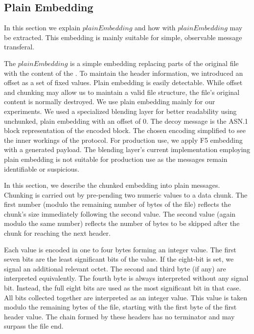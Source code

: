 \subsection{Plain Embedding}
In this section we explain $plainEmbedding$ and how \VortexMessages{} with $plainEmbedding$ may be extracted. This embedding is mainly suitable for simple, observable message transferal.

The $plainEmbedding$ is a simple embedding replacing parts of the original file with the content of the \VortexMessage. To maintain the header information, we introduced an offset as a set of fixed values. Plain embedding is easily detectable. While offset and chunking may allow us to maintain a valid file structure, the file's original content is normally destroyed. We use plain embedding mainly for our experiments. We used a specialized blending layer for better readability using unchunked, plain embedding with an offset of $0$. The decoy message is the ASN.1 block representation of the encoded block. The chosen encoding simplified to see the inner workings of the protocol. For production use, we apply F5 embedding with a generated payload. The blending layer's current implementation employing plain embedding is not suitable for production use as the messages remain identifiable or suspicious.


\label{sec:chunkingPlain}
In this section, we describe the chunked embedding into plain messages. Chunking is carried out by pre-pending two numeric values to a data chunk. The first number (modulo the remaining number of bytes of the file) reflects the chunk's size immediately following the second value. The second value (again modulo the same number)  reflects the number of bytes to be skipped after the chunk for reaching the next header.

Each value is encoded in one to four bytes forming an integer value. The first seven bits are the least significant bits of the value. If the eight-bit is set, we signal an additional relevant octet. The second and third byte (if any) are interpreted equivalently. The fourth byte is always interpreted without any signal bit. Instead, the full eight bits are used as the most significant bit in that case. All bits collected together are interpreted as an integer value. This value is taken modulo the remaining bytes of the file, starting with the first byte of the first header value. The chain formed by these headers has no terminator and may surpass the file end.


